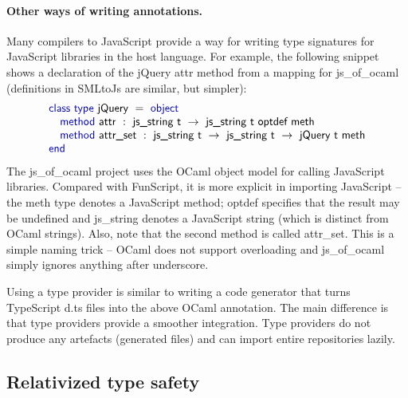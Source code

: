 \documentclass[submission,copyright,creativecommons]{eptcs}
\newcommand{\kvd}[1]{\textnormal{\textcolor{kvdclr}{\sffamily #1}}}
\newcommand{\ident}[1]{\textnormal{\sffamily #1}}
\begin{document}
\vspace{-1em}
\paragraph{Other ways of writing annotations.}
Many compilers to JavaScript provide a way for writing type signatures for JavaScript
libraries in the host language. For example, the following snippet shows a declaration of the
jQuery \ident{attr} method from a mapping for js\_of\_ocaml \cite{js_ocmal} (definitions in 
SMLtoJs \cite{js_sml} are similar, but simpler):
%
\begin{equation*}
\begin{array}{l}
 \kvd{class type}~\ident{jQuery}~=~\kvd{object} \\
 \quad \kvd{method}~\ident{attr}~:~\ident{js\_string t} ~\rightarrow~ \ident{js\_string t optdef meth} \\
 \quad \kvd{method}~\ident{attr\_set}~:~\ident{js\_string t} ~\rightarrow~ \ident{js\_string t} ~\rightarrow~ \ident{jQuery t meth} \\
 \kvd{end}
\end{array}
\end{equation*}
%
The js\_of\_ocaml project uses the OCaml object model for calling JavaScript libraries. 
Compared with FunScript, it is more explicit in importing JavaScript -- the \ident{meth}
type denotes a JavaScript method; \ident{optdef} specifies that the result may be 
undefined and \ident{js\_string} denotes a JavaScript string (which is distinct from OCaml
strings). Also, note that the second method is called \ident{attr\_set}. This is a simple
naming trick -- OCaml does not support overloading and js\_of\_ocaml simply ignores anything
after underscore.

Using a type provider is similar to writing a code generator that turns TypeScript 
\textcolor{strclr}{\ttfamily d.ts} files into the above OCaml annotation. The main difference
is that type providers provide a smoother integration. Type providers do not produce any artefacts
(generated files) and can import entire repositories lazily.


\subsection{Relativized type safety}
\label{sec:tp-relative}
\end{document}
